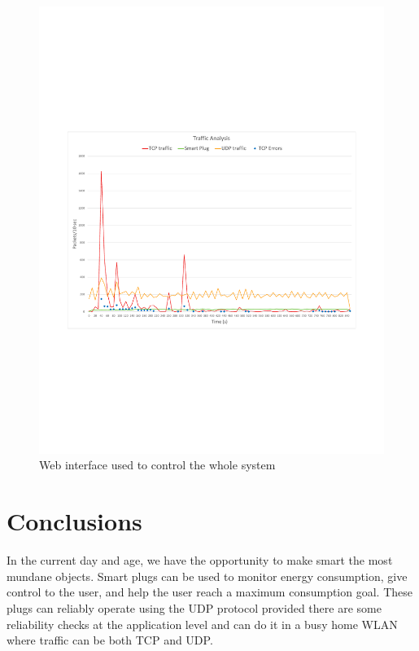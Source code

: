 \documentclass[conference]{IEEEtran}
\begin{document}
	\begin{figure}[htbp]
		\centering
		\includegraphics[width=\linewidth]{assets/grafico}
		\caption{Web interface used to control the whole system}
		\label{fig:grafico}
	\end{figure}
	
	
	\section{Conclusions}
	In the current day and age, we have the opportunity to make smart the most mundane objects. Smart plugs can be used to monitor energy consumption, give control to the user, and help the user reach a maximum consumption goal. These plugs can reliably operate using the UDP protocol provided there are some reliability checks at the application level and can do it in a busy home WLAN where traffic can be both TCP and UDP.
	
	{}
	
	
\end{document}
